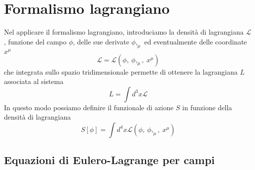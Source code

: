 \section{Formalismo lagrangiano}

    Nel applicare il formalismo lagrangiano, introduciamo la densità di lagrangiana $\mathcal L$, funzione del campo $\phi$, delle sue derivate $\phi,_\mu$ ed eventualmente delle coordinate $x^\mu$
\begin{equation} \label{lagrangianacampi}
    \mathcal L = \mathcal L (\phi,~\phi,_\mu,~x^\mu)
\end{equation}
    che integrata sullo spazio tridimensionale permette di ottenere la lagrangiana $L$ associata al sistema
\begin{equation*}
    L = \int d^3 x \mathcal L
\end{equation*}
    In questo modo possiamo definire il funzionale di azione $S$ in funzione della densità di lagrangiana
\begin{equation} \label{azionecampi}
    S[\phi] = \int d^4 x \mathcal L (\phi,~\phi,_\mu,~x^\mu)
\end{equation}

\subsection{Equazioni di Eulero-Lagrange per campi}

